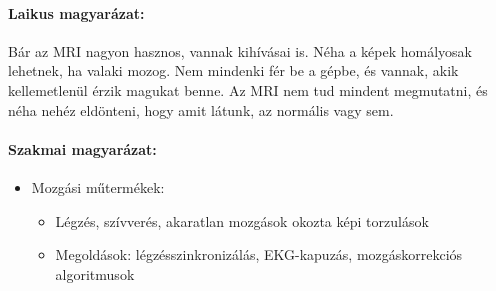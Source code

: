 \documentclass[a4paper,12pt]{article}
\begin{document}
\paragraph{Laikus magyarázat:} Bár az MRI nagyon hasznos, vannak kihívásai is. Néha a képek homályosak lehetnek, ha valaki mozog. Nem mindenki fér be a gépbe, és vannak, akik kellemetlenül érzik magukat benne. Az MRI nem tud mindent megmutatni, és néha nehéz eldönteni, hogy amit látunk, az normális vagy sem.

\paragraph{Szakmai magyarázat:} \begin{itemize} \item Mozgási műtermékek: \begin{itemize} \item Légzés, szívverés, akaratlan mozgások okozta képi torzulások \item Megoldások: légzésszinkronizálás, EKG-kapuzás, mozgáskorrekciós algoritmusok \end{itemize}


\end{itemize}
\end{document}
